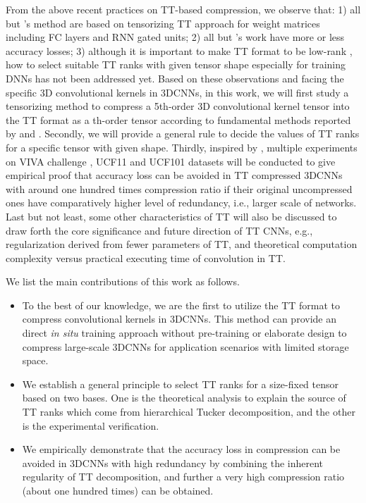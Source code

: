 \documentclass[a4paper,fleqn]{cas-dc}
\begin{document}
From the above recent practices on TT-based compression, we observe that: 1) all but \citet{Garipov_2016_TTCNN}'s method are based on tensorizing TT approach for weight matrices including FC layers and RNN gated units; 2) all but \citet{Yang_2017_TTRNN}'s work have more or less accuracy losses; 3) although it is important to make TT format to be low-rank \citep{Lee_2014_TTRanks,Bengua_2017_TTRanks}, how to select suitable TT ranks with given tensor shape especially for training DNNs has not been addressed yet. Based on these observations and facing the specific 3D convolutional kernels in 3DCNNs, in this work, we will first study a tensorizing method to compress a 5th-order 3D convolutional kernel tensor into the TT format as a th-order tensor according to fundamental methods reported by \citet{Novikov_2015_TT} and \citet{Garipov_2016_TTCNN}. Secondly, we will provide a general rule to decide the values of TT ranks for a specific tensor with given shape. Thirdly, inspired by \citet{Yang_2017_TTRNN}, multiple experiments on VIVA challenge \citep{Ohn-Bar_2014_VIVA}, UCF11 \citep{Liu_2011_UCF11} and UCF101 \citep{Soomro_2012_UCF101} datasets will be conducted to give empirical proof that accuracy loss can be avoided in TT compressed 3DCNNs with around one hundred times compression ratio if their original uncompressed ones have comparatively higher level of redundancy, i.e., larger scale of networks. Last but not least, some other characteristics of TT will also be discussed to draw forth the core significance and future direction of TT CNNs, e.g., regularization derived from fewer parameters of TT, and theoretical computation complexity versus practical executing time of convolution in TT.

We list the main contributions of this work as follows.
\begin{itemize}
\item To the best of our knowledge, we are the first to utilize the TT format to compress convolutional kernels in 3DCNNs. This method can provide an direct \emph{in situ} training approach without pre-training or elaborate design to compress large-scale 3DCNNs for application scenarios with limited storage space.

\item We establish a general principle to select TT ranks for a size-fixed tensor based on two bases. One is the theoretical analysis to explain the source of TT ranks which come from hierarchical Tucker decomposition, and the other is the experimental verification.

\item We empirically demonstrate that the accuracy loss in compression can be avoided in 3DCNNs with high redundancy by combining the inherent regularity of TT decomposition, and further a very high compression ratio (about one hundred times) can be obtained.
\end{itemize}
\end{document}
